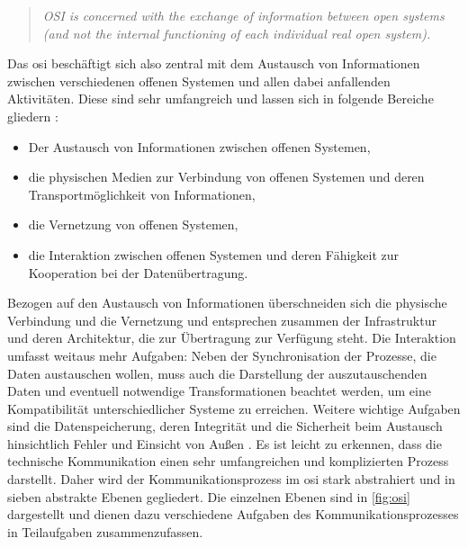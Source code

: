 \begin{quote}
\textit{\Gun OSI is concerned with the exchange of information between open systems (and not the internal functioning of each individual real open system).\Gob}
\end{quote}

Das \acrshort{osi} beschäftigt sich also zentral mit dem Austausch von Informationen zwischen verschiedenen offenen Systemen und allen dabei anfallenden Aktivitäten. Diese sind sehr umfangreich und lassen sich in folgende Bereiche gliedern \cite[S.~3f.]{osi96}:

\begin{itemize}
	\item Der Austausch von Informationen zwischen offenen Systemen,
	\item die physischen Medien zur Verbindung von offenen Systemen und deren Transportmöglichkeit von Informationen,
	\item die Vernetzung von offenen Systemen,
	\item die Interaktion zwischen offenen Systemen und deren Fähigkeit zur Kooperation bei der Datenübertragung.
\end{itemize}

Bezogen auf den Austausch von Informationen überschneiden sich die physische Verbindung und die Vernetzung und entsprechen zusammen der Infrastruktur und deren Architektur, die zur Übertragung zur Verfügung steht. Die Interaktion umfasst weitaus mehr Aufgaben: Neben der Synchronisation der Prozesse, die Daten austauschen wollen, muss auch die Darstellung der auszutauschenden Daten und eventuell notwendige Transformationen beachtet werden, um eine Kompatibilität unterschiedlicher Systeme zu erreichen. Weitere wichtige Aufgaben sind die Datenspeicherung, deren Integrität und die Sicherheit beim Austausch hinsichtlich Fehler und Einsicht von Außen \cite[S.~4]{osi96}.
Es ist leicht zu erkennen, dass die technische Kommunikation einen sehr umfangreichen und komplizierten Prozess darstellt. Daher wird der Kommunikationsprozess im \acrshort{osi} stark abstrahiert und in sieben abstrakte Ebenen gegliedert. Die einzelnen Ebenen sind in \ref{fig:osi} dargestellt und dienen dazu verschiedene Aufgaben des Kommunikationsprozesses in Teilaufgaben zusammenzufassen.

